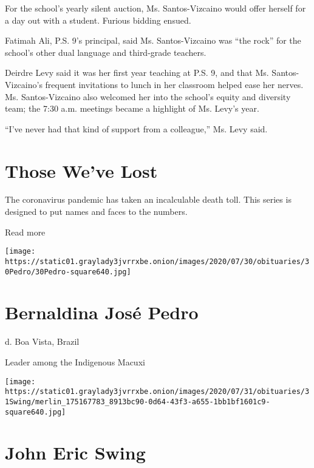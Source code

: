 For the school's yearly silent auction, Ms. Santos-Vizcaino would offer
herself for a day out with a student. Furious bidding ensued.

Fatimah Ali, P.S. 9's principal, said Ms. Santos-Vizcaino was ``the
rock'' for the school's other dual language and third-grade teachers.

Deirdre Levy said it was her first year teaching at P.S. 9, and that Ms.
Santos-Vizcaino's frequent invitations to lunch in her classroom helped
ease her nerves. Ms. Santos-Vizcaino also welcomed her into the school's
equity and diversity team; the 7:30 a.m. meetings became a highlight of
Ms. Levy's year.

``I've never had that kind of support from a colleague,'' Ms. Levy said.

\href{https://www.nytimes3xbfgragh.onion/interactive/2020/obituaries/people-died-coronavirus-obituaries.html?action=click\&pgtype=Article\&state=default\&region=BELOW_MAIN_CONTENT\&context=covid_obits_promo}{}

\hypertarget{those-weve-lost}{%
\section{Those We've Lost}\label{those-weve-lost}}

The coronavirus pandemic has taken an incalculable death toll. This
series is designed to put names and faces to the numbers.

Read more

\texttt{[image: https://static01.graylady3jvrrxbe.onion/images/2020/07/30/obituaries/30Pedro/30Pedro-square640.jpg]}

\hypertarget{bernaldina-josuxe9-pedro}{%
\section{Bernaldina José Pedro}\label{bernaldina-josuxe9-pedro}}

d. Boa Vista, Brazil

Leader among the Indigenous Macuxi

\texttt{[image: https://static01.graylady3jvrrxbe.onion/images/2020/07/31/obituaries/31Swing/merlin\_175167783\_8913bc90-0d64-43f3-a655-1bb1bf1601c9-square640.jpg]}

\hypertarget{john-eric-swing}{%
\section{John Eric Swing}\label{john-eric-swing}}

